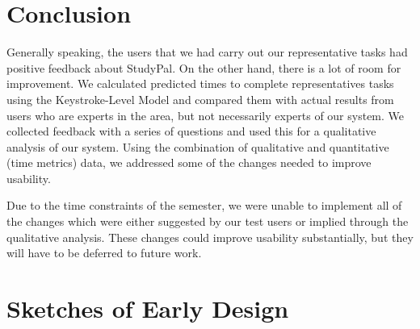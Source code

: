 \documentclass[conference]{IEEEtran}
\begin{document}
\section{Conclusion}

Generally speaking, the users that we had carry out our representative tasks had positive feedback about StudyPal.  On the other hand, there is a lot of room for improvement.  We calculated predicted times to complete representatives tasks using the Keystroke-Level Model and compared them with actual results from users who are experts in the area, but not necessarily experts of our system.  We collected feedback with a series of questions and used this for a qualitative analysis of our system. Using the combination of qualitative and quantitative (time metrics) data, we addressed some of the changes needed to improve usability.

Due to the time constraints of the semester, we were unable to implement all of the changes which were either suggested by our test users or implied through the qualitative analysis.  These changes could improve usability substantially, but they will have to be deferred to future work.





%


\appendices
\section{Sketches of Early Design}
\end{document}
